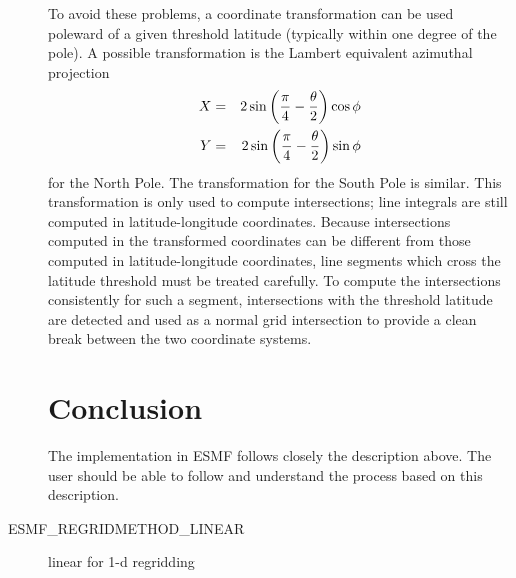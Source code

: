 \begin{description}
     To avoid these problems, a coordinate transformation can be used poleward
     of a given threshold latitude (typically within one degree of the pole).
     A possible transformation is the Lambert equivalent azimuthal projection
\begin{eqnarray}
X &=& 2\sin\left({\pi \over 4} - {\theta \over 2}\right)\cos\phi \nonumber \\
Y &=& 2\sin\left({\pi \over 4} - {\theta \over 2}\right)\sin\phi 
\end{eqnarray}
     for the North Pole.  The transformation for the South Pole is similar.
     This transformation is only used to compute intersections; line integrals
     are still computed in latitude-longitude coordinates.  Because intersections
     computed in the transformed coordinates can be different from those computed
     in latitude-longitude coordinates, line segments which cross the latitude
     threshold must be treated carefully.  To compute the intersections
     consistently for such a segment, intersections with the threshold latitude
     are detected and used as a normal grid intersection to provide a clean break
     between the two coordinate systems.

\section{Conclusion}

     The implementation in ESMF follows closely the description above.  The user
     should be able to follow and understand the process based on this
     description.

\item[ESMF\_REGRIDMETHOD\_LINEAR  ] linear for 1-d regridding

\end{description}

